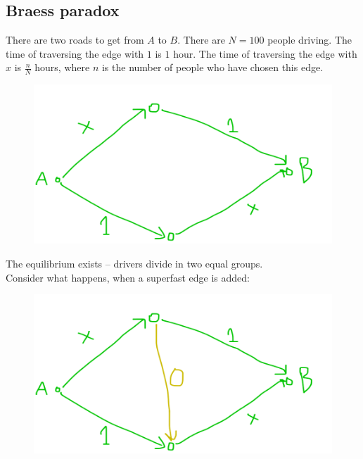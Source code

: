 \subsection*{Braess paradox}
There are two roads to get from $A$ to $B$. There are $N = 100$ people driving. The time of traversing the edge with $1$ is $1$ hour.
The time of traversing the edge with $x$ is $\frac{n}{N}$ hours, where $n$ is the number of people who have chosen this edge.
\begin{figure}[H]
    \centering
    \includegraphics[scale=0.2]{content/graphics/game22.png}
\end{figure}
\noindent
The equilibrium exists -- drivers divide in two equal groups.\\
Consider what happens, when a superfast edge is added:
\begin{figure}[H]
    \centering
    \includegraphics[scale=0.2]{content/graphics/game23.png}
\end{figure}

